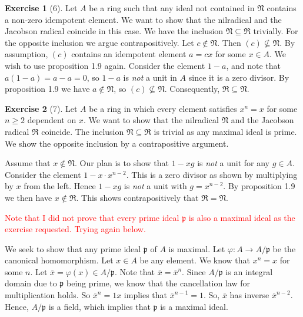\documentclass{article}
\theoremstyle{definition}
\newtheorem*{exercise}{Exercise}
\begin{document}
\begin{exercise}[6]
    Let $A$ be a ring such that any ideal not contained in
    $\mathfrak{N}$ contains a non-zero idempotent element. We want to
    show that the nilradical and the Jacobson radical coincide in this
    case. We have the inclusion $\mathfrak{N} \subseteq \mathfrak{R}$
    trivially. For the opposite inclusion we argue contrapositively.
    Let $c \notin \mathfrak{N}$. Then $(c) \not \subseteq
    \mathfrak{N}$. By assumption, $(c)$ contains an idempotent element
    $a = cx$ for some $x \in A$. We wish to use proposition 1.9 again.
    Consider the element $1 - a$, and note that $a(1 - a) = a - a =
    0$, so $1 - a$ is \emph{not} a unit in $A$ since it is a zero
    divisor. By proposition 1.9 we have $a \notin \mathfrak{N}$, so
    $(c) \not \subseteq \mathfrak{N}$. Consequently, $\mathfrak{R}
    \subseteq \mathfrak{N}$.
\end{exercise}

\begin{exercise}[7] Let $A$ be a ring in which every element satisfies
    $x^n = x$ for some $n \geq 2$ dependent on $x$. We want to show
    that the nilradical $\mathfrak{N}$ and the Jacobson radical
    $\mathfrak{R}$ coincide.  The inclusion $\mathfrak{N} \subseteq
    \mathfrak{R}$ is trivial as any maximal ideal is prime. We show
    the opposite inclusion by a contrapositive argument.

    Assume that $x \notin \mathfrak{N}$. Our plan is to show that $1 -
    xg$ is \emph{not} a unit for any $g \in A$. Consider the element
    $1 - x \cdot x^{n-2}$. This is a zero divisor as shown by
    multiplying by $x$ from the left. Hence $1 - xg$ is \emph{not} a
    unit with $g = x^{n-2}$. By proposition 1.9 we then have $x \notin
    \mathfrak{R}$. This shows contrapositively that $\mathfrak{R} =
    \mathfrak{N}$.

    \textcolor{red}{Note that I did not prove that every prime ideal
        $\mathfrak{p}$ is also a maximal ideal as the exercise requested.
    Trying again below.}

    We seek to show that any prime ideal $\mathfrak{p}$ of $A$ is
    maximal. Let $\varphi : A \to A / \mathfrak{p}$ be the canonical
    homomorphism. Let $x \in A$ be any element. We know that $x^n = x$
    for some $n$. Let $\bar{x} = \varphi(x) \in A / \mathfrak{p}$.
    Note that $\bar{x} = \bar{x}^n$. Since $A / \mathfrak{p}$ is an
    integral domain due to $\mathfrak{p}$ being prime, we know that
    the cancellation law for multiplication holds. So $\bar{x}^n = 1
    x$ implies that $\bar{x}^{n-1} = 1$. So, $\bar{x}$ has
    inverse $\bar{x}^{n-2}$. Hence, $A / \mathfrak{p}$ is a field,
    which implies that $\mathfrak{p}$ is a maximal ideal.
\end{exercise}
\end{document}
